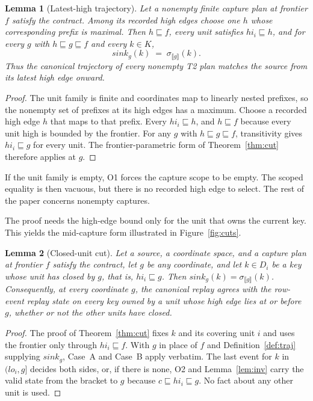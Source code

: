 \documentclass[sigconf,nonacm,10pt]{acmart}
\theoremstyle{plain}
\newtheorem{lemma}{Lemma}[section]
\theoremstyle{definition}
\newcommand{\den}[1]{\llbracket #1 \rrbracket}   %
\newcommand{\pre}{\sqsubseteq}                   %
\newcommand{\window}[2]{(#1,#2]}                 %
\newcommand{\sink}{\mathit{sink}}                %
\newcommand{\keys}{K}                            %
\begin{document}
\begin{lemma}[Latest-high trajectory]\label{lem:latest-high}
Let a nonempty finite capture plan at frontier $f$ satisfy the
contract. Among its recorded high edges choose one $h$ whose corresponding
prefix is maximal. Then $h \pre f$, every unit satisfies
$hi_i \pre h$, and for every $g$ with $h \pre g \pre f$ and every
$k \in \keys$,
\[
\sink_g(k) \;=\; \sigma_{\den{g}}(k).
\]
Thus the canonical trajectory of every nonempty T2 plan matches the
source from its latest high edge onward.
\end{lemma}

\begin{proof}
The unit family is finite and coordinates map to linearly
nested prefixes, so the nonempty set of prefixes at its high edges has a
maximum. Choose a recorded high edge $h$ that maps to that prefix. Every
$hi_i \pre h$, and $h \pre f$ because every unit high is bounded by
the frontier. For any $g$ with $h \pre g \pre f$, transitivity gives
$hi_i \pre g$ for every unit. The frontier-parametric form of
Theorem~\ref{thm:cut} therefore applies at $g$.
\end{proof}

If the unit family is empty, O1 forces the capture scope to be empty.
The scoped equality is then vacuous, but there is no recorded high
edge to select. The rest of the paper concerns nonempty captures.

The proof needs the high-edge bound only for the unit that owns the
current key. This yields the mid-capture form illustrated in
Figure~\ref{fig:cuts}.

\begin{lemma}[Closed-unit cut]\label{lem:closed}
Let a source, a coordinate space, and a capture plan at frontier $f$
satisfy the contract, let $g$ be any coordinate, and let $k \in D_i$
be a key whose unit has closed by $g$, that is, $hi_i \pre g$. Then
$\sink_g(k) = \sigma_{\den{g}}(k)$. Consequently, at every coordinate
$g$, the canonical replay agrees with the row-event replay state on
every key owned by a unit whose high edge lies at or before $g$,
whether or not the other units have closed.
\end{lemma}

\begin{proof}
The proof of Theorem~\ref{thm:cut} fixes $k$ and its covering unit $i$
and uses the frontier only through $hi_i \pre f$. With $g$ in place
of $f$ and Definition~\ref{def:traj} supplying $\sink_g$, Case~A and
Case~B apply verbatim. The last event for $k$ in $\window{lo_i}{g}$
decides both sides, or, if there is none, O2 and Lemma~\ref{lem:inv}
carry the valid state from the bracket to $g$ because
$c \pre hi_i \pre g$. No fact about any other unit is used.
\end{proof}
\end{document}

